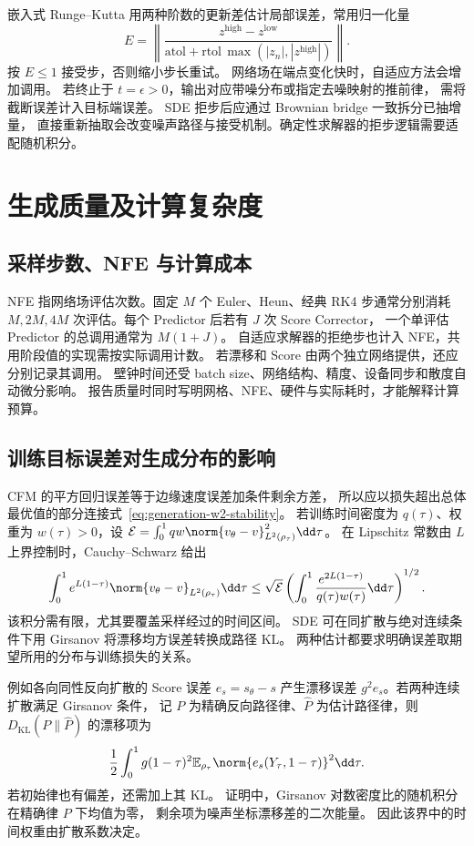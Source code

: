 嵌入式 Runge--Kutta 用两种阶数的更新差估计局部误差，常用归一化量
\[
 E=\left\|\frac{z^{\mathrm{high}}-z^{\mathrm{low}}}
 {\mathrm{atol}+\mathrm{rtol}\,\max(|z_n|,|z^{\mathrm{high}}|)}\right\|.
\]
按 \(E\le1\) 接受步，否则缩小步长重试。
网络场在端点变化快时，自适应方法会增加调用。
若终止于 \(t=\epsilon>0\)，输出对应带噪分布或指定去噪映射的推前律，
需将截断误差计入目标端误差。
SDE 拒步后应通过 Brownian bridge 一致拆分已抽增量，
直接重新抽取会改变噪声路径与接受机制。确定性求解器的拒步逻辑需要适配随机积分。

\section{生成质量及计算复杂度}
\label{sec:generation-quality}

\subsection{采样步数、NFE 与计算成本}

NFE 指网络场评估次数。固定 \(M\) 个 Euler、Heun、经典 RK4 步通常分别消耗
\(M,2M,4M\) 次评估。每个 Predictor 后若有 \(J\) 次 Score Corrector，
一个单评估 Predictor 的总调用通常为 \(M(1+J)\)。
自适应求解器的拒绝步也计入 NFE，共用阶段值的实现需按实际调用计数。
若漂移和 Score 由两个独立网络提供，还应分别记录其调用。
壁钟时间还受 batch size、网络结构、精度、设备同步和散度自动微分影响。
报告质量时同时写明网格、NFE、硬件与实际耗时，才能解释计算预算。

\subsection{训练目标误差对生成分布的影响}

CFM 的平方回归误差等于边缘速度误差加条件剩余方差，
所以应以损失超出总体最优值的部分连接式~\eqref{eq:generation-w2-stability}。
若训练时间密度为 \(q(\tau)\)、权重为 \(w(\tau)>0\)，设
\(\mathcal E=\int_0^1 q w\norm{v_\theta-v}_{L^2(\rho_\tau)}^2\dd\tau\)。
在 Lipschitz 常数由 \(L\) 上界控制时，Cauchy--Schwarz 给出
\[
 \int_0^1e^{L(1-\tau)}\norm{v_\theta-v}_{L^2(\rho_\tau)}\dd\tau
 \le\sqrt{\mathcal E}
 \left(\int_0^1\frac{e^{2L(1-\tau)}}{q(\tau)w(\tau)}\dd\tau\right)^{1/2}.
\]
该积分需有限，尤其要覆盖采样经过的时间区间。
SDE 可在同扩散与绝对连续条件下用 Girsanov 将漂移均方误差转换成路径 KL。
两种估计都要求明确误差取期望所用的分布与训练损失的关系。

例如各向同性反向扩散的 Score 误差 \(e_s=s_\theta-s\)
产生漂移误差 \(g^2e_s\)。若两种连续扩散满足 Girsanov 条件，
记 \(P\) 为精确反向路径律、\(\widehat P\) 为估计路径律，则 \(D_{\mathrm{KL}}(P\|\widehat P)\) 的漂移项为
\[
 \frac12\int_0^1g(1-\tau)^2
       \mathbb E_{\rho_\tau}\norm{e_s(Y_\tau,1-\tau)}^2\dd\tau.
\]
若初始律也有偏差，还需加上其 KL。
证明中，Girsanov 对数密度比的随机积分在精确律 \(P\) 下均值为零，
剩余项为噪声坐标漂移差的二次能量。
因此该界中的时间权重由扩散系数决定。

